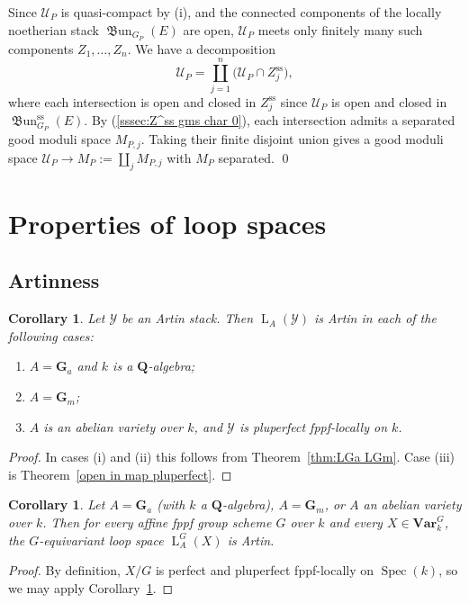 \documentclass[12pt, oneside]{amsart}
\numberwithin{equation}{section}
\newtheorem{corollary}[subsubsection]{Corollary}
\theoremstyle{remark}
\theoremstyle{plain}
\newcommand{\Loop}{\operatorname{L}}
\newcommand{\YY}{\mathcal{Y}}
\DeclareMathOperator{\spc}{Spec}
\newcommand{\GGa}{\mathbf{G}_{a}}
\newcommand{\GGm}{\mathbf{G}_{m}}
\newcommand{\bQ}{\mathbf{Q}}
\newcommand{\Var}{\mathbf{Var}_{k}}
\newcommand{\UU}{\mathcal{U}}
\renewcommand{\ss}{\mathrm{ss}}
\newcommand{\frBun}{\operatorname{\mathfrak{B}un}}
\begin{document}
Since $\UU_P$ is quasi-compact by (i), and the connected components of the locally noetherian stack $\frBun_{G_P}(E)$ are open, $\UU_P$ meets only finitely many such components $Z_1,\ldots,Z_n$.
We have a decomposition
\[
  \UU_P=\coprod_{j=1}^n\bigl(\UU_P\cap Z_j^{\ss}\bigr),
\]
where each intersection is open and closed in $Z_j^{\ss}$ since $\UU_P$ is open and closed in $\frBun_{G_P}^{\ss}(E)$.
By (\ref{sssec:Z^ss gms char 0}), each intersection admits a separated good moduli space $M_{P,j}$.
Taking their finite disjoint union gives a good moduli space $\UU_P\to M_P := \coprod_j M_{P,j}$ with $M_P$ separated.
\qed

\section{Properties of loop spaces}\label{sec:loop properties}

\subsection{Artinness}

\begin{corollary}\label{cor:loop Artin}
  Let $\YY$ be an Artin stack.
  Then $\Loop_A(\YY)$ is Artin in each of the following cases:
  \begin{enumerate}
    \item $A = \GGa$ and $k$ is a $\bQ$-algebra;
    \item $A = \GGm$;
    \item $A$ is an abelian variety over $k$, and $\YY$ is pluperfect fppf-locally on $k$.
  \end{enumerate}
\end{corollary}
\begin{proof}
  In cases (i) and (ii) this follows from Theorem~\ref{thm:LGa LGm}.
  Case (iii) is Theorem~\ref{open in map pluperfect}.
\end{proof}

\begin{corollary}\label{cor:loop Artin VarG}
  Let $A = \GGa$ (with $k$ a $\bQ$-algebra), $A=\GGm$, or $A$ an abelian variety over $k$.
  Then for every affine fppf group scheme $G$ over $k$ and every $X \in \Var^G$, the $G$-equivariant loop space $\Loop_A^G(X)$ is Artin.
\end{corollary}
\begin{proof}
	By definition, $X/G$ is perfect and pluperfect fppf-locally on $\spc(k)$, so we may apply Corollary~\ref{cor:loop Artin}.
\end{proof}
\end{document}
